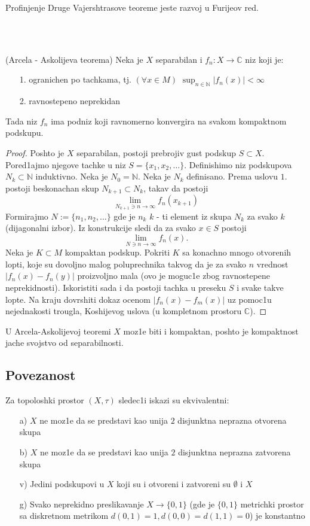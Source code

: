 \documentclass[a4paper,12pt]{article}
\newcommand{\NN}{\mathbb{N}}
\newcommand{\CC}{\mathbb{C}}
\newcommand{\ps}{\subset}
\begin{document}
\begin{nap}
Profinjenje Druge Vajershtrasove teoreme jeste razvoj u Furijeov red.
\end{nap}
\\ \\
\begin{tma}
(Arcela - Askolijeva teorema) Neka je $X$ separabilan i $f_n: X \to \CC$ niz koji je:
\begin{itemize}
\item[1.] ogranichen po tachkama, tj. $(\forall x \in M)$ $\sup_{n \in \NN} |f_n(x)| < \infty$
\item[2.] ravnostepeno neprekidan
\end{itemize}
Tada niz $f_n$ ima podniz koji ravnomerno konvergira na svakom kompaktnom podskupu.
\end{tma}
\begin{proof}
Poshto je $X$ separabilan, postoji prebrojiv gust podskup $S \ps X$. Pored1ajmo njegove tachke u niz $S = \{x_1, x_2, \dots \}$. 
	Definishimo niz podskupova $N_k \ps \NN$ induktivno. Neka je $N_0 = \NN$. Neka je $N_k$ definisano. Prema uslovu $1.$ 
	postoji beskonachan skup $N_{k+1} \ps N_k$, takav da postoji 
\[\lim_{ N_{k+1}\ni n \to \infty} f_n(x_{k+1}) \]
	Formirajmo $N := \{n_1, n_2, \dots \}$ gde je $n_k$ $k$ - ti element iz skupa $N_k$ za svako $k$ (dijagonalni izbor). Iz konstrukcije
sledi da za svako $x\in S$ postoji
	\[ \lim_{N\ni n \to \infty}f_n(x) .\] 
	Neka je $K\ps M$ kompaktan podskup. Pokriti $K$ sa konachno mnogo otvorenih lopti, koje su dovoljno malog poluprechnika takvog
	da je za svako  $n$ vrednost $|f_n(x) - f_n(y)|$ proizvoljno mala (ovo je moguc1e zbog ravnostepene neprekidnosti).
	Iskoristiti sada i da postoji tachka u preseku $S$ i svake takve lopte. Na kraju dovrshiti dokaz ocenom
	$|f_n(x) - f_m(x)|$ uz pomoc1u nejednakosti trougla, Koshijevog uslova (u kompletnom prostoru $\CC$).
\end{proof}

\begin{nap}
U Arcela-Askolijevoj teoremi $X$ moz1e biti i kompaktan, poshto je kompakt\-nost jache svojstvo od separabilnosti.
\end{nap}
\subsection{Povezanost}

\begin{tma}
Za topoloshki prostor $(X, \tau)$ sledec1i iskazi su ekvivalentni:
\begin{itemize}
\item[a)] $X$ ne moz1e da se predstavi kao unija $2$ disjunktna neprazna otvorena skupa
\item[b)]  $X$ ne moz1e da se predstavi kao unija $2$ disjunktna neprazna zatvorena skupa
\item[v)] Jedini podskupovi u $X$ koji su i otvoreni i zatvoreni su $\emptyset$ i $X$
\item[g)] Svako neprekidno preslikavanje $X \to \{0,1\}$ (gde je $\{0,1\}$ metrichki prostor sa diskretnom metrikom $d(0,1) = 1, d(0,0) = d(1,1) = 0$) je konstantno
\end{itemize}
\end{tma}
\end{document}
